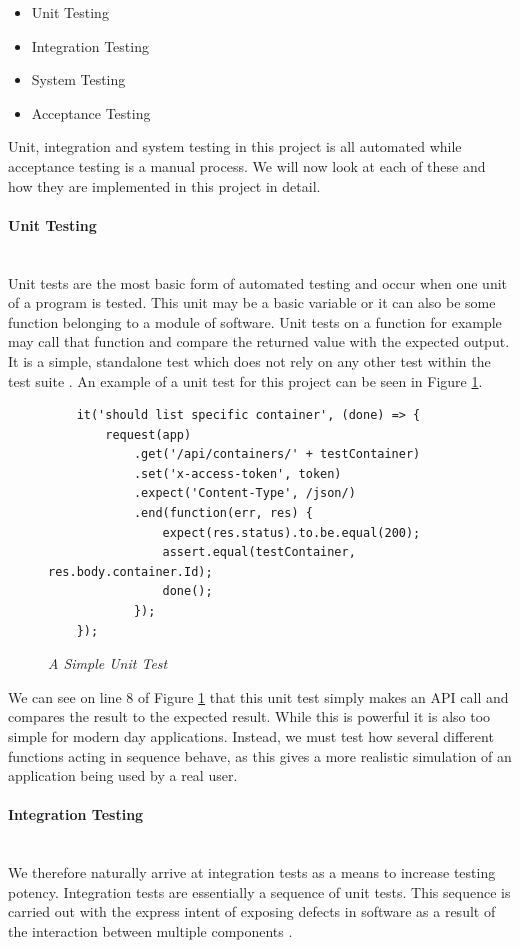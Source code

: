 \begin{itemize}
	\item Unit Testing
	\item Integration Testing
	\item System Testing
	\item Acceptance Testing
\end{itemize}

Unit, integration and system testing in this project is all automated while acceptance testing is a manual process. We will now look at each of these and how they are implemented in this project in detail.

\paragraph{Unit Testing}\mbox{}\\
Unit tests are the most basic form of automated testing and occur when one unit of a program is tested. This unit may be a basic variable or it can also be some function belonging to a module of software. Unit tests on a function for example may call that function and compare the returned value with the expected output. It is a simple, standalone test which does not rely on any other test within the test suite \citep{UnitTesting2017}. An example of a unit test for this project can be seen in Figure \ref{fig:unit_test}.

\begin{figure}[!ht]
\begin{lstlisting}
	it('should list specific container', (done) => {
		request(app)
			.get('/api/containers/' + testContainer)
			.set('x-access-token', token)
			.expect('Content-Type', /json/)
			.end(function(err, res) {
				expect(res.status).to.be.equal(200);
				assert.equal(testContainer, res.body.container.Id);
				done();
			});
	}); 
\end{lstlisting}
\caption{\em A Simple Unit Test}
\label{fig:unit_test}
\end{figure}

We can see on line 8 of Figure \ref{fig:unit_test} that this unit test simply makes an \gls{API} call and compares the result to the expected result. While this is powerful it is also too simple for modern day applications. Instead, we must test how several different functions acting in sequence behave, as this gives a more realistic simulation of an application being used by a real user.

\paragraph{Integration Testing}\mbox{}\\
We therefore naturally arrive at integration tests as a means to increase testing potency. Integration tests are essentially a sequence of unit tests. This sequence is carried out with the express intent of exposing defects in software as a result of the interaction between multiple components \citep{IntegrationTesting2017}.


